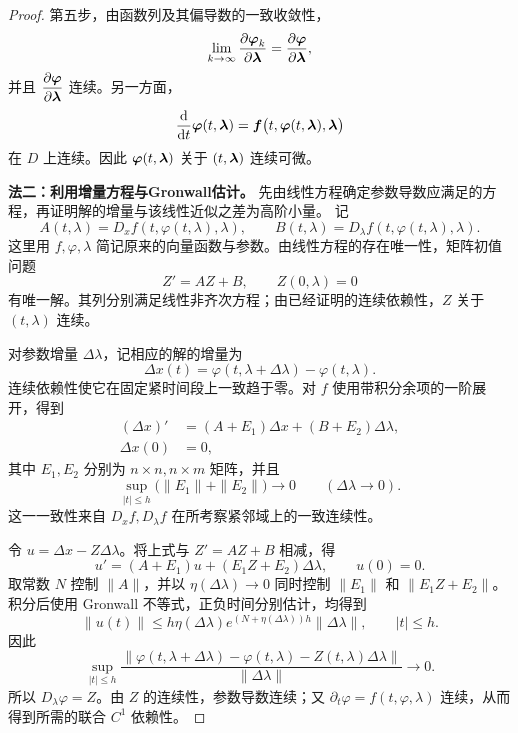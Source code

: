 \begin{proof}
	第五步，由函数列及其偏导数的一致收敛性，
	\[
		\lim_{k\to\infty}
		\dfrac{\partial\boldsymbol{\varphi}_k}{\partial\boldsymbol{\lambda}}
		=\dfrac{\partial\boldsymbol{\varphi}}{\partial\boldsymbol{\lambda}},
	\]
	并且 $\dfrac{\partial\boldsymbol{\varphi}}
	{\partial\boldsymbol{\lambda}}$ 连续。另一方面，
	\[
		\dfrac{\mathrm{d}}{\mathrm{d} t}\boldsymbol{\varphi}(t,\boldsymbol{\lambda})
		=\boldsymbol{f}\bigl(
		t,\boldsymbol{\varphi}(t,\boldsymbol{\lambda}),\boldsymbol{\lambda}
		\bigr)
	\]
	在 $D$ 上连续。因此 $\boldsymbol{\varphi}(t,\boldsymbol{\lambda})$ 关于
	$(t,\boldsymbol{\lambda})$ 连续可微。
	
	\textbf{法二：利用增量方程与Gronwall估计。}
先由线性方程确定参数导数应满足的方程，再证明解的增量与该线性近似之差为高阶小量。
记
\[
 A(t,\lambda)=D_xf(t,\varphi(t,\lambda),\lambda),\qquad
 B(t,\lambda)=D_\lambda f(t,\varphi(t,\lambda),\lambda).
\]
这里用 $f,\varphi,\lambda$ 简记原来的向量函数与参数。由线性方程的存在唯一性，矩阵初值问题
\[
 Z'=AZ+B,\qquad Z(0,\lambda)=0
\]
有唯一解。其列分别满足线性非齐次方程；由已经证明的连续依赖性，$Z$ 关于 $(t,\lambda)$ 连续。

对参数增量 $\Delta\lambda$，记相应的解的增量为
\[
 \Delta x(t)=\varphi(t,\lambda+\Delta\lambda)-\varphi(t,\lambda).
\]
连续依赖性使它在固定紧时间段上一致趋于零。对 $f$ 使用带积分余项的一阶展开，得到
\begin{align*}
 (\Delta x)'&=(A+E_1)\Delta x+(B+E_2)\Delta\lambda,\\
 \Delta x(0)&=0,
\end{align*}
其中 $E_1,E_2$ 分别为 $n\times n,n\times m$ 矩阵，并且
\[
 \sup_{|t|\leq h}\bigl(\|E_1\|+\|E_2\|\bigr)\longrightarrow0
 \qquad(\Delta\lambda\to0).
\]
这一一致性来自 $D_xf,D_\lambda f$ 在所考察紧邻域上的一致连续性。

令 $u=\Delta x-Z\Delta\lambda$。将上式与 $Z'=AZ+B$ 相减，得
\[
 u'=(A+E_1)u+(E_1Z+E_2)\Delta\lambda,\qquad u(0)=0.
\]
取常数 $N$ 控制 $\|A\|$，并以 $\eta(\Delta\lambda)\to0$ 同时控制
$\|E_1\|$ 和 $\|E_1Z+E_2\|$。积分后使用 Gronwall 不等式，正负时间分别估计，均得到
\[
 \|u(t)\|\leq h\eta(\Delta\lambda)
 e^{(N+\eta(\Delta\lambda))h}\|\Delta\lambda\|,
 \qquad |t|\leq h.
\]
因此
\[
 \sup_{|t|\leq h}
 \frac{\|\varphi(t,\lambda+\Delta\lambda)-\varphi(t,\lambda)-Z(t,\lambda)\Delta\lambda\|}
 {\|\Delta\lambda\|}\longrightarrow0.
\]
所以 $D_\lambda\varphi=Z$。由 $Z$ 的连续性，参数导数连续；又
$\partial_t\varphi=f(t,\varphi,\lambda)$ 连续，从而得到所需的联合 $C^1$ 依赖性。
\end{proof}

